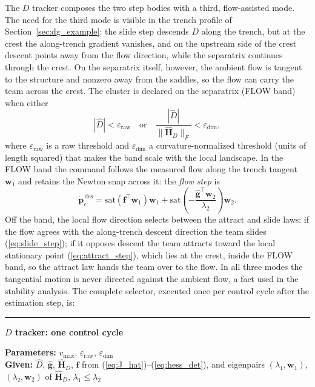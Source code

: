 \documentclass[lettersize,journal]{IEEEtran}
\begin{document}
The $D$ tracker composes the two step bodies with a third,
flow-assisted mode. The need for the third mode is visible in the trench
profile of Section~\ref{sec:dg_example}: the slide step descends $D$
along the trench, but at the crest the along-trench gradient vanishes,
and on the upstream side of the crest descent points away from the flow
direction, while the separatrix continues through the crest. On the
separatrix itself, however, the ambient flow is tangent to the structure
and nonzero away from the saddles, so the flow can carry the team across
the crest. The cluster is declared on the separatrix
(FLOW band) when either
\begin{equation}
    |\hat{D}| < \varepsilon_{\text{raw}}
    \quad\text{or}\quad
    \frac{|\hat{D}|}{\|\hat{\mathbf{H}}_D\|_F} < \varepsilon_{\text{dim}},
    \label{eq:flow_band}
\end{equation}
where $\varepsilon_{\text{raw}}$ is a raw threshold and
$\varepsilon_{\text{dim}}$ a curvature-normalized threshold (units of
length squared) that makes the band scale with the local landscape. In
the FLOW band the command follows the measured flow along the trench
tangent $\mathbf{w}_1$ and retains the Newton snap across it: the
\emph{flow step} is
\begin{equation}
    \dot{\mathbf{p}}_c^{\,\text{des}} =
    \mathrm{sat}\!\left(\mathbf{f}^\top \mathbf{w}_1\right)\mathbf{w}_1
    + \mathrm{sat}\!\left(-\frac{\hat{\mathbf{g}}^\top
    \mathbf{w}_2}{\lambda_2}\right)\mathbf{w}_2.
    \label{eq:flow_step}
\end{equation}
Off the band, the local flow direction selects between the attract and
slide laws: if the flow agrees with the along-trench descent direction
the team slides (\ref{eq:slide_step}); if it opposes descent the team
attracts toward the local stationary point (\ref{eq:attract_step}),
which lies at the crest, inside the FLOW band, so the attract law hands
the team over to the flow. In all three modes the tangential motion is
never directed against the ambient flow, a fact used in the stability
analysis. The complete selector, executed once per control cycle after
the estimation step, is:

\vspace{4pt}
\hrule
\vspace{4pt}
\noindent\textbf{$D$ tracker: one control cycle}

\vspace{3pt}
\noindent\textbf{Parameters:} $v_{\max}$, $\varepsilon_{\text{raw}}$,
$\varepsilon_{\text{dim}}$\\
\textbf{Given:} $\hat{D}$, $\hat{\mathbf{g}}$, $\hat{\mathbf{H}}_D$,
$\mathbf{f}$ from (\ref{eq:J_hat})--(\ref{eq:hess_det}), and eigenpairs
$(\lambda_1, \mathbf{w}_1)$, $(\lambda_2, \mathbf{w}_2)$ of
$\hat{\mathbf{H}}_D$, $\lambda_1 \leq \lambda_2$
\end{document}
